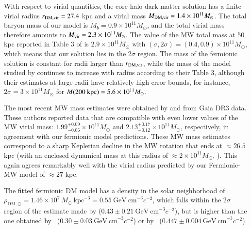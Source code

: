 \documentclass[twocolumn]{aa}
\begin{document}
With respect to virial quantities, the core-halo dark matter solution has a finite virial radius $r_{\rm{DM,vir}}=27.4$ kpc and a virial mass
$M_{\rm{DM,vir}}=1.4\times10^{11} M_\odot$. The total baryon mass of our model is $M_b=0.9\times10^{11}M_\odot$, and the total virial mass therefore amounts to
$M_{\rm{vir}}=2.3\times10^{11} M_\odot$. The value of the MW total mass at 50 kpc reported in Table 3
of \citet{2014MNRAS.445.3788G} is $2.9\times10^{11} M_\odot$ with $(\sigma, 2\sigma)=(0.4,0.9)\times10^{11} M_\odot$, which means that our solution lies in the $2\sigma$ region.
The mass of the fermionic solution is constant for radii larger than
$r_{\rm{DM,vir}}$, while the mass of the model studied by \citet{2014MNRAS.445.3788G} continues to increase with radius according to their Table 3, although their estimates at large radii have relatively
high error bounds, for instance, $2\sigma=3\times10^{11} M_\odot$ for $M(200 \hbox{ kpc}) =5.6\times10^{11} M_\odot$.

The most recent MW mass estimates were obtained by
\citet{Jiao2023} and \citet{Ou2023} from Gaia DR3 data. These authors reported data that are compatible with even lower values of the MW virial mass: $1.99^{+0.09}_{-0.06}\times10^{11} M_\odot$ and $2.13^{+0.17}_{-0.12}\times10^{11} M_\odot$, respectively, in agreement with our fermionic model predictions. These MW mass estimates correspond to a sharp Keplerian decline in the MW rotation that ends at $\approx 26.5$ kpc (with an enclosed dynamical mass at this radius of $\approx 2\times 10^{11} M_\odot$, \citealp{Jiao2023}). This again agrees remarkably well with the virial radius predicted by our Fermionic-MW model of $\approx 27$ kpc.

The fitted fermionic DM model has a density in the solar neighborhood of
$\rho_{\mathrm{DM},\odot}=1.46\times10^7~M_\odot~\mathrm{kpc}^{-3}=0.55~\mathrm{GeV~cm}^{-3} c^{-2}$, which falls within the $2\sigma$ region of the estimate made by \citealt{Salucci2010} ($0.43\pm 0.21~\mathrm{GeV~cm}^{-3} c^{-2}$),
but is higher than the one obtained by~\citealt{Eilers_2019} ($0.30\pm0.03~\mathrm{GeV~cm}^{-3} c^{-2}$) or by~\citealt{Ou_2024MNRAS} ($0.447\pm0.004~\mathrm{GeV~cm}^{-3} c^{-2}$).
\end{document}
